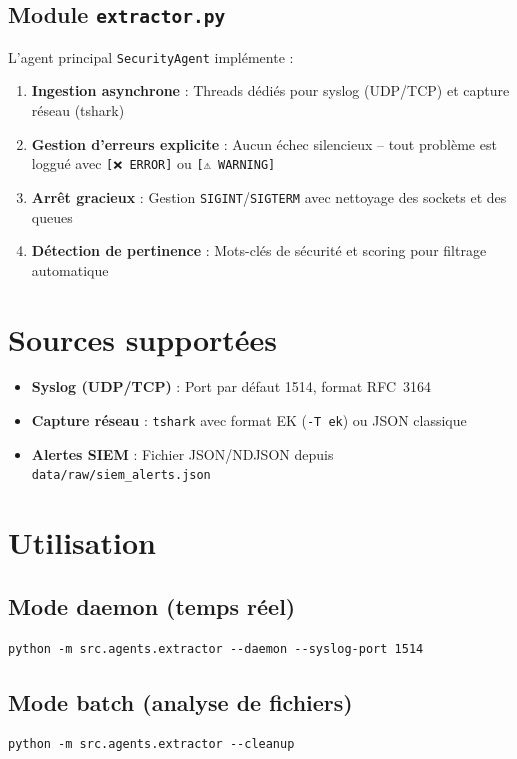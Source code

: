 \documentclass[a4paper,12pt]{article}
\begin{document}
\subsection*{Module \texttt{extractor.py}}

L'agent principal \texttt{SecurityAgent} implémente :

\begin{enumerate}[label=\color{accentTeal}\faIcon{hashtag}, leftmargin=*, itemsep=0.5em]
  \item \textbf{Ingestion asynchrone} : Threads dédiés pour syslog (UDP/TCP) et capture réseau (tshark)
  \item \textbf{Gestion d'erreurs explicite} : Aucun échec silencieux -- tout problème est loggué avec \texttt{[❌ ERROR]} ou \texttt{[⚠️ WARNING]}
  \item \textbf{Arrêt gracieux} : Gestion \texttt{SIGINT}/\texttt{SIGTERM} avec nettoyage des sockets et des queues
  \item \textbf{Détection de pertinence} : Mots-clés de sécurité et scoring pour filtrage automatique
\end{enumerate}

\section*{Sources supportées}

\begin{itemize}[label=\color{accentTeal}, leftmargin=*, itemsep=0.8em]
  \item \textbf{Syslog (UDP/TCP)} : Port par défaut 1514, format RFC~3164
  \item \textbf{Capture réseau} : \texttt{tshark} avec format EK (\texttt{-T ek}) ou JSON classique
  \item \textbf{Alertes SIEM} : Fichier JSON/NDJSON depuis \texttt{data/raw/siem\_alerts.json}
\end{itemize}

\section*{Utilisation}

\subsection*{Mode daemon (temps réel)}

\begin{lstlisting}
python -m src.agents.extractor --daemon --syslog-port 1514
\end{lstlisting}

\subsection*{Mode batch (analyse de fichiers)}

\begin{lstlisting}
python -m src.agents.extractor --cleanup
\end{lstlisting}
\end{document}
